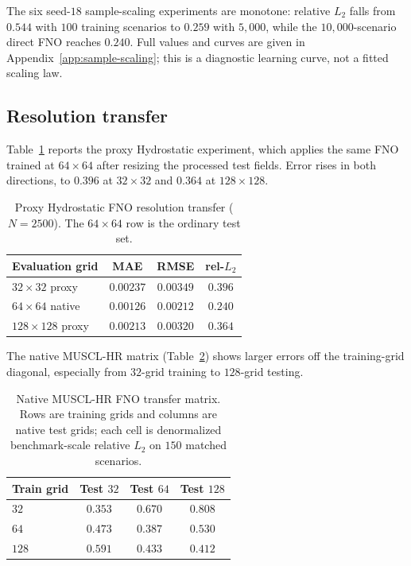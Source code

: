 The six seed-$18$ sample-scaling experiments are monotone: relative $L_2$ falls from $0.544$ with $100$ training scenarios to $0.259$ with $5{,}000$, while the $10{,}000$-scenario direct FNO reaches $0.240$. Full values and curves are given in Appendix~\ref{app:sample-scaling}; this is a diagnostic learning curve, not a fitted scaling law.

\FloatBarrier
\subsection{Resolution transfer}
\label{subsec:res-crossres}

Table~\ref{tab:crossres} reports the proxy Hydrostatic experiment, which applies the same FNO trained at $64 \times 64$ after resizing the processed test fields. Error rises in both directions, to $0.396$ at $32 \times 32$ and $0.364$ at $128 \times 128$.

\begin{table}[pos=!htbp]
\centering
\caption{Proxy Hydrostatic FNO resolution transfer ($ N = 2500$). The $64 \times 64$ row is the ordinary test set.}
\label{tab:crossres}
\begin{tabular}{lccc}
    \toprule
    Evaluation grid & MAE & RMSE & rel-$L_2$ \\
    \midrule
    $32  \times 32$  proxy  & $0.00237$ & $0.00349$ & $0.396$ \\
    $64  \times 64$  native & $0.00126$ & $0.00212$ & $0.240$ \\
    $128 \times 128$ proxy  & $0.00213$ & $0.00320$ & $0.364$ \\
    \bottomrule
\end{tabular}
\end{table}

The native MUSCL-HR matrix (Table~\ref{tab:crossres-native-transfer}) shows larger errors off the training-grid diagonal, especially from $32$-grid training to $128$-grid testing.

\begin{table}[pos=!htbp]
\centering
\caption{Native MUSCL-HR FNO transfer matrix. Rows are training grids and columns are native test grids; each cell is denormalized benchmark-scale relative $L_2$ on $150$ matched scenarios.}
\label{tab:crossres-native-transfer}
\begin{tabular}{lccc}
    \toprule
    Train grid & Test $32$ & Test $64$ & Test $128$ \\
    \midrule
    $32$  & $\mathbf{0.353}$ & $0.670$ & $0.808$ \\
    $64$  & $0.473$ & $\mathbf{0.387}$ & $0.530$ \\
    $128$ & $0.591$ & $0.433$ & $\mathbf{0.412}$ \\
    \bottomrule
\end{tabular}
\end{table}

